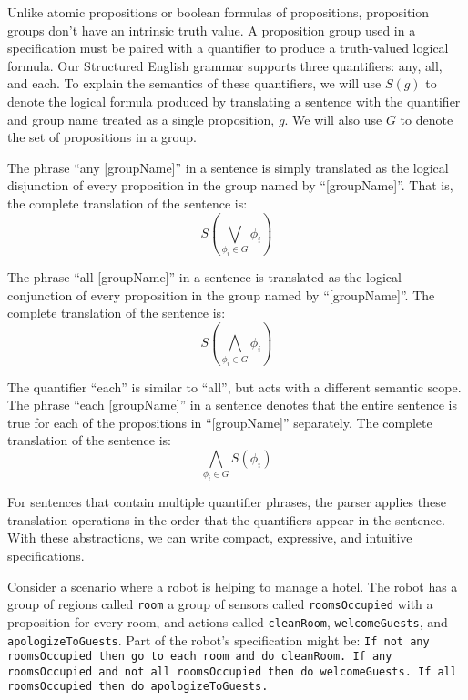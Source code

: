 Unlike atomic propositions or boolean formulas of propositions, proposition groups don't have an intrinsic truth value. A proposition group used in a specification must be paired with a quantifier to produce a truth-valued logical formula. Our Structured English grammar supports three quantifiers: any, all, and each. To explain the semantics of these quantifiers, we will use $S(g)$ to denote the logical formula produced by translating a sentence with the quantifier and group name treated as a single proposition, $g$. We will also use $G$ to denote the set of propositions in a group. 
\par
The phrase ``any [groupName]'' in a sentence is simply translated as the logical disjunction of every proposition in the group named by ``[groupName]''. That is, the complete translation of the sentence is: 
\begin{equation*}
	S( \bigvee \limits_{\phi_i \in G} \phi_i )
\end{equation*}
\par
The phrase ``all [groupName]'' in a sentence is translated as the logical conjunction of every proposition in the group named by ``[groupName]''. The complete translation of the sentence is: 
\begin{equation*}
	S( \bigwedge \limits_{\phi_i \in G} \phi_i )
\end{equation*}
\par
The quantifier ``each'' is similar to ``all'', but acts with a different semantic scope. The phrase ``each [groupName]'' in a sentence denotes that the entire sentence is true for each of the propositions in ``[groupName]'' separately. The complete translation of the sentence is:
\begin{equation*}
 	\bigwedge\limits_{\phi_i \in G} S(\phi_i)
\end{equation*}
\par
For sentences that contain multiple quantifier phrases, the parser applies these translation operations in the order that the quantifiers appear in the sentence. With these abstractions, we can write compact, expressive, and intuitive specifications. 
\par
\begin{myExample}\label{Ex:quantifiers} 	
	Consider a scenario where a robot is helping to manage a hotel. The robot has a group of regions called \texttt{room} a group of sensors called \texttt{roomsOccupied} with a proposition for every room, and actions called \texttt{cleanRoom}, \texttt{welcomeGuests}, and \texttt{apologizeToGuests}. Part of the robot's specification might be: \texttt{If not any roomsOccupied then go to each room and do cleanRoom. If any roomsOccupied and not all roomsOccupied then do welcomeGuests. If all roomsOccupied then do apologizeToGuests.} 
\end{myExample}

